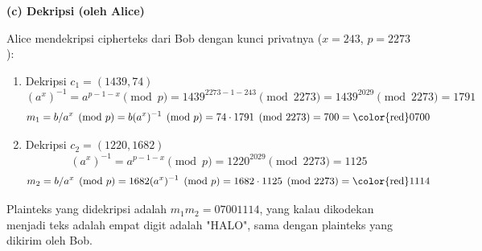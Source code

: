 \documentclass{article}
\begin{document}

\textbf{(c) Dekripsi (oleh Alice)}

Alice mendekripsi cipherteks dari Bob dengan kunci privatnya ($x = 243$, $p = 2273$):

\begin{enumerate}
  \item[(i)] Dekripsi $c_1 = (1439, 74)$
  \[ (a^x)^{-1} = a^{p-1-x} \pmod p = 1439^{2273-1-243} \pmod{2273} = 1439^{2029} \pmod{2273} = 1791 \]
  \[ m_1 = b/a^x \pmod p = b(a^x)^{-1} \pmod p = 74 \cdot 1791 \pmod{2273} = 700 = \text{\color{red}0700} \]
  \item[(ii)] Dekripsi $c_2 = (1220, 1682)$
  \[ (a^x)^{-1} = a^{p-1-x} \pmod p = 1220^{2029} \pmod{2273} = 1125 \]
  \[ m_2 = b/a^x \pmod p = 1682(a^x)^{-1} \pmod p = 1682 \cdot 1125 \pmod{2273} = \text{\color{red}1114} \]
\end{enumerate}

Plainteks yang didekripsi adalah $m_1 m_2 = 07001114$, yang kalau dikodekan menjadi teks adalah empat digit adalah "HALO", sama dengan plainteks yang dikirim oleh Bob.
\end{document}
